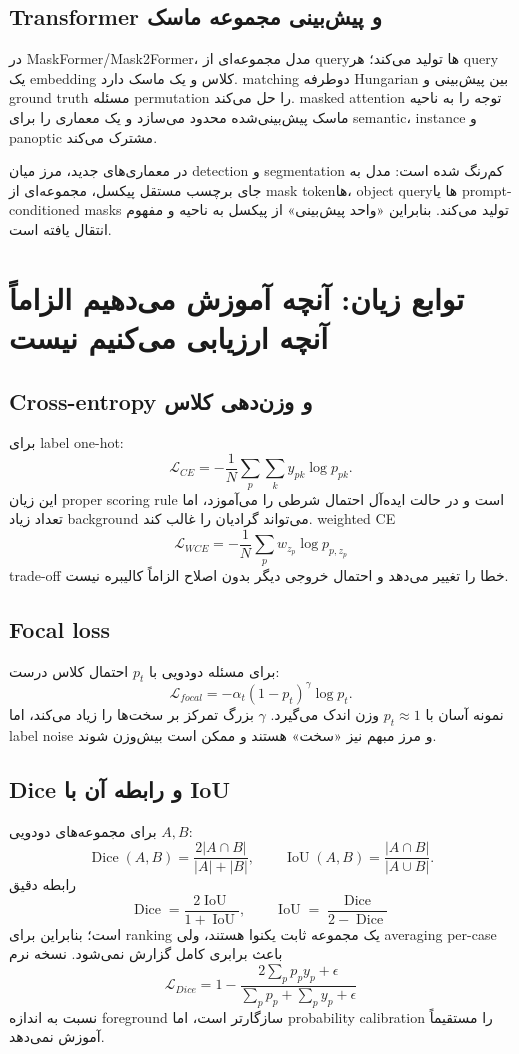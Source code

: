 \documentclass[12pt,openany,oneside]{book}
\newcommand{\IoU}{\operatorname{IoU}}
\newcommand{\Dice}{\operatorname{Dice}}
\begin{document}
\subsection{Transformer و پیش‌بینی مجموعه ماسک}
در MaskFormer/Mask2Former، مدل مجموعه‌ای از queryها تولید می‌کند؛ هر query یک embedding کلاس و یک ماسک دارد.
matching دوطرفه Hungarian بین پیش‌بینی و ground truth مسئله permutation را حل می‌کند. masked attention توجه را به
ناحیه ماسک پیش‌بینی‌شده محدود می‌سازد و یک معماری را برای semantic، instance و panoptic مشترک می‌کند.

\begin{futurebox}
در معماری‌های جدید، مرز میان detection و segmentation کم‌رنگ شده است: مدل به جای برچسب مستقل پیکسل، مجموعه‌ای
از mask tokenها، object queryها یا prompt-conditioned masks تولید می‌کند. بنابراین «واحد پیش‌بینی» از پیکسل به
ناحیه و مفهوم انتقال یافته است.
\end{futurebox}

\section{توابع زیان: آنچه آموزش می‌دهیم الزاماً آنچه ارزیابی می‌کنیم نیست}
\subsection{Cross-entropy و وزن‌دهی کلاس}
برای label one-hot:
\[
\mathcal L_{CE}=-\frac1N\sum_p\sum_k y_{pk}\log p_{pk}.
\]
این زیان proper scoring rule است و در حالت ایده‌آل احتمال شرطی را می‌آموزد، اما تعداد زیاد background می‌تواند
گرادیان را غالب کند. weighted CE
\[
\mathcal L_{WCE}=-\frac1N\sum_p w_{z_p}\log p_{p,z_p}
\]
trade-off خطا را تغییر می‌دهد و احتمال خروجی دیگر بدون اصلاح الزاماً کالیبره نیست.

\subsection{Focal loss}
برای مسئله دودویی با \(p_t\) احتمال کلاس درست:
\[
\mathcal L_{focal}=-\alpha_t(1-p_t)^\gamma\log p_t.
\]
نمونه آسان با \(p_t\approx1\) وزن اندک می‌گیرد. \(\gamma\) بزرگ تمرکز بر سخت‌ها را زیاد می‌کند، اما label noise و
مرز مبهم نیز «سخت» هستند و ممکن است بیش‌وزن شوند.

\subsection{Dice و رابطه آن با IoU}
برای مجموعه‌های دودویی \(A,B\):
\[
\Dice(A,B)=\frac{2|A\cap B|}{|A|+|B|},
\qquad
\IoU(A,B)=\frac{|A\cap B|}{|A\cup B|}.
\]
رابطه دقیق
\[
\Dice=\frac{2\IoU}{1+\IoU},
\qquad
\IoU=\frac{\Dice}{2-\Dice}
\]
است؛ بنابراین برای ranking یک مجموعه ثابت یکنوا هستند، ولی averaging per-case باعث برابری کامل گزارش نمی‌شود.
نسخه نرم
\[
\mathcal L_{Dice}=1-\frac{2\sum_p p_py_p+\epsilon}{\sum_p p_p+\sum_p y_p+\epsilon}
\]
نسبت به اندازه foreground سازگارتر است، اما probability calibration را مستقیماً آموزش نمی‌دهد.
\end{document}

